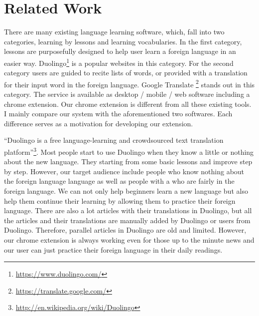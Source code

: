 \documentclass[11pt]{article}
\begin{document}
\section{Related Work}
There are many existing language learning software, which, fall into two categories, learning by  
lessons and learning vocabularies. In the first category, %
lessons are purposefully designed to help user learn a foreign language in an easier way.
Duolingo\footnote{\url{https://www.duolingo.com/}} is a popular websites in this category. 
For the second category
users are guided to recite lists of words, or provided with a translation for their input word 
in the foreign language.
Google Translate \footnote{\url{https://translate.google.com/}} stands out in this category. The service 
is available as desktop / mobile / web software including a chrome extension. Our chrome extension is 
different from all these existing tools. 
I mainly compare our system  with the aforementioned two softwares. Each difference serves as a motivation 
for developing our extension.

``Duolingo is a free language-learning and crowdsourced text translation platform''\footnote{\url{http://en.wikipedia.org/wiki/Duolingo}}.
Most people start to use Duolingo when they know a little or nothing about the new language. They starting 
from some basic lessons and improve step by step.
However, our target audience include people who know nothing about the foreign language language as well as people with a who are 
fairly in the foreign language. We can not only help beginners learn a new language but also help them continue their learning 
by allowing them to practice their foreign language. There are also a lot articles with their translations in Duolingo, but 
all the articles and their translations are manually added by Duolingo or users from Duolingo. Therefore, parallel articles in Duolingo 
are old and limited. However, our chrome extension is always working even for those up to the minute news and our user can just practice 
their foreign language in their daily readings.
\end{document}
